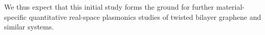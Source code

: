 We thus expect that this initial study forms the ground for further material-specific quantitative real-space plasmonics studies of twisted bilayer graphene and similar systems.
     





